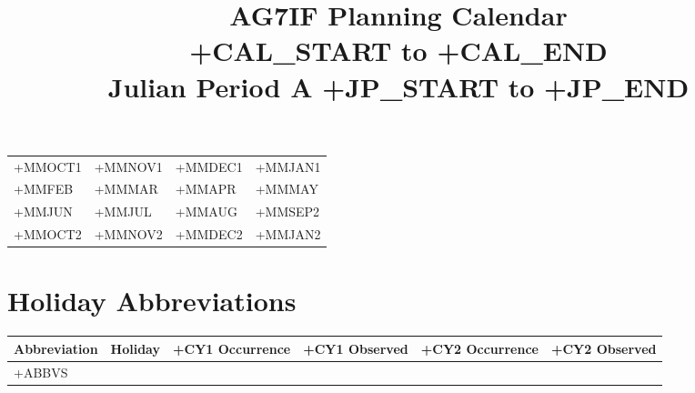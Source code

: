 \documentclass[10pt]{book}
\title{\Huge{}AG7IF Planning Calendar \\ +CAL_START to +CAL_END \\ Julian Period A +JP_START to +JP_END}
\author{}
\date{}
\newcommand{\minifirstoctober}{+MMOCT1}
\newcommand{\minifirstnovember}{+MMNOV1}
\newcommand{\minifirstdecember}{+MMDEC1}
\newcommand{\minifirstjanuary}{+MMJAN1}
\newcommand{\minifebruary}{+MMFEB}
\newcommand{\minimarch}{+MMMAR}
\newcommand{\miniapril}{+MMAPR}
\newcommand{\minimay}{+MMMAY}
\newcommand{\minijune}{+MMJUN}
\newcommand{\minijuly}{+MMJUL}
\newcommand{\miniaugust}{+MMAUG}
\newcommand{\minisecondseptember}{+MMSEP2}
\newcommand{\minisecondoctober}{+MMOCT2}
\newcommand{\minisecondnovember}{+MMNOV2}
\newcommand{\miniseconddecember}{+MMDEC2}
\newcommand{\minisecondjanuary}{+MMJAN2}
\begin{document}
\maketitle

\noindent
\begin{tabularx}{\textwidth}{XXXX}
    \minifirstoctober      &
    \minifirstnovember     &
    \minifirstdecember     &
    \minifirstjanuary     \\

    \minifebruary          &
    \minimarch             &
    \miniapril             &
    \minimay              \\

    \minijune              &
    \minijuly              &
    \miniaugust            &
    \minisecondseptember  \\

    \minisecondoctober     &
    \minisecondnovember    &
    \miniseconddecember    &
    \minisecondjanuary    \\
\end{tabularx}

\pagebreak

\section*{Holiday Abbreviations}
\begin{tabularx}{\textwidth}{lXrrrr}
    \toprule
    Abbreviation & Holiday & +CY1 Occurrence & +CY1 Observed & +CY2 Occurrence & +CY2 Observed \\
    \midrule
    +ABBVS
    \bottomrule
\end{tabularx}

\newpage
\end{document}
